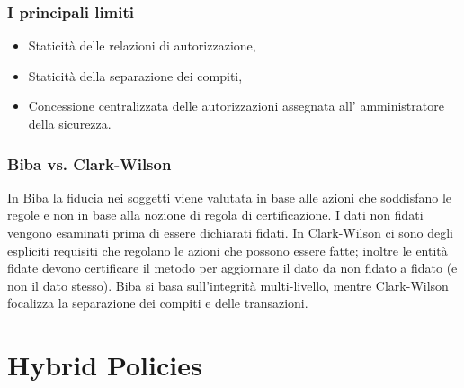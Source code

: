 \subsubsection{I principali limiti}
\begin{itemize}
      \item Staticità delle relazioni di autorizzazione,
      \item Staticità della separazione dei compiti,
      \item Concessione centralizzata delle autorizzazioni assegnata all’
            amministratore della sicurezza.
\end{itemize}

\subsubsection{Biba vs. Clark-Wilson}
In Biba la fiducia nei soggetti viene valutata in base alle azioni
che soddisfano le regole e non in base alla nozione di regola di certificazione.
I dati non fidati
vengono esaminati prima di essere dichiarati fidati. In Clark-Wilson ci sono
degli espliciti requisiti
che regolano le azioni che possono essere fatte; inoltre le entità fidate devono
certificare il metodo
per aggiornare il dato da non fidato a fidato (e non il dato stesso).
Biba si basa sull'integrità multi-livello, mentre Clark-Wilson focalizza la
separazione dei compiti e
delle transazioni.


\section{Hybrid Policies}


